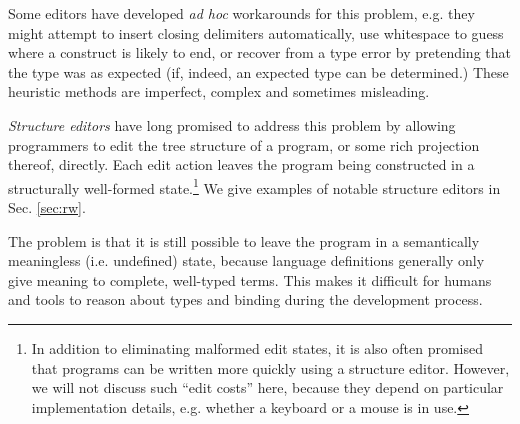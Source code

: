Some editors have developed \emph{ad hoc} workarounds for this problem, e.g. they might attempt to insert closing delimiters automatically, use whitespace to guess where a construct is likely to end, or recover from a type error by pretending that the type was as expected (if, indeed, an expected type can be determined.) These heuristic methods are imperfect, complex and sometimes misleading.



\emph{Structure editors} have long promised to address this
problem by allowing programmers to edit the tree structure of a program, or some rich projection thereof, 
directly. Each edit action leaves the program being constructed in a
structurally well-formed state.\footnote{In addition to eliminating malformed edit states, it is also often promised that programs can be written more quickly using a structure editor. However, we will not discuss such ``edit costs'' here, because they depend on particular implementation details, e.g. whether a keyboard or a mouse is in use.} We give examples of notable structure editors in Sec. \ref{sec:rw}.  

The problem is that it is still possible to leave the program in a semantically meaningless (i.e. undefined) state, because language definitions generally only give meaning to complete, well-typed terms. This makes it difficult for humans and tools to reason about types and binding during the development process.  %



